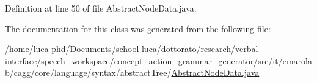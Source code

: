 Definition at line 50 of file Abstract\-Node\-Data.\-java.



The documentation for this class was generated from the following file\-:\begin{DoxyCompactItemize}
\item 
/home/luca-\/phd/\-Documents/school luca/dottorato/research/verbal interface/speech\-\_\-workspace/concept\-\_\-action\-\_\-grammar\-\_\-generator/src/it/emarolab/cagg/core/language/syntax/abstract\-Tree/\hyperlink{AbstractNodeData_8java}{Abstract\-Node\-Data.\-java}\end{DoxyCompactItemize}

